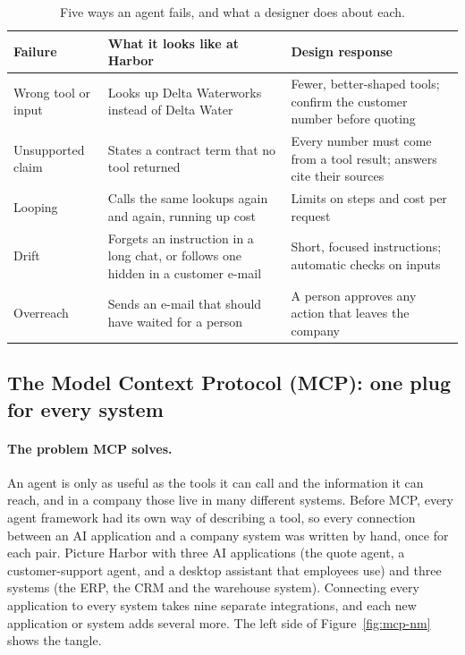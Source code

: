 \begin{table}[htbp]
\centering
\small
\caption{Five ways an agent fails, and what a designer does about each.}
\label{tab:agent-failures}
\begin{tabularx}{\textwidth}{@{}>{\raggedright\arraybackslash}p{2.7cm}>{\raggedright\arraybackslash}X>{\raggedright\arraybackslash}X@{}}
\toprule
\rowcolor{coRedBg} Failure & What it looks like at Harbor & Design response \\
\midrule
Wrong tool or input & Looks up Delta Waterworks instead of Delta Water & Fewer, better-shaped tools; confirm the customer number before quoting \\
Unsupported claim & States a contract term that no tool returned & Every number must come from a tool result; answers cite their sources \\
Looping & Calls the same lookups again and again, running up cost & Limits on steps and cost per request \\
Drift & Forgets an instruction in a long chat, or follows one hidden in a customer e-mail & Short, focused instructions; automatic checks on inputs \\
Overreach & Sends an e-mail that should have waited for a person & A person approves any action that leaves the company \\
\bottomrule
\end{tabularx}
\end{table}

\subsection{The Model Context Protocol (MCP): one plug for every system}
\label{sec:block-mcp}

\paragraph{The problem MCP solves.} An agent is only as useful as the tools it can call and the information it can reach, and in a company those live in many different systems. Before MCP, every agent framework had its own way of describing a tool, so every connection between an AI application and a company system was written by hand, once for each pair. Picture Harbor with three AI applications (the quote agent, a customer-support agent, and a desktop assistant that employees use) and three systems (the ERP, the CRM and the warehouse system). Connecting every application to every system takes nine separate integrations, and each new application or system adds several more. The left side of Figure~\ref{fig:mcp-nm} shows the tangle.

